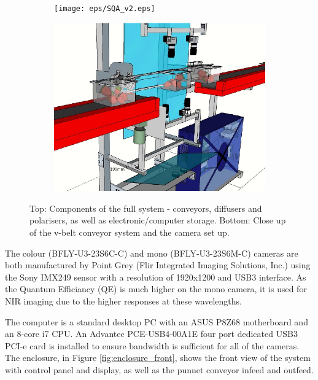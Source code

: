 \documentclass[conference]{IEEEtran}
\begin{document}
\begin{figure}[ht]
	\centering
	\begin{subfigure}{.5\textwidth}
		\centering
		\texttt{[image: eps/SQA\_v2.eps]}
		\caption{}
		\label{fig:enclosure_cross_sec}
	\end{subfigure}%
	
	\vspace{\floatsep}
	
	\begin{subfigure}{.5\textwidth}
		\centering
		\includegraphics[width=1\linewidth]{eps/QAS_cross_sec.eps}
		\caption{}
		\label{fig:close_up_cross_sec}
	\end{subfigure}%
	
	\caption{Top: Components of the full system - conveyors, diffusers and polarisers, as well as electronic/computer storage. Bottom: Close up of the v-belt conveyor system and the camera set up. }
	\label{fig:sample1}
\end{figure}

The colour (BFLY-U3-23S6C-C) and mono (BFLY-U3-23S6M-C) cameras are both manufactured by Point Grey (Flir Integrated Imaging Solutions, Inc.) using the Sony IMX249 sensor with a resolution of 1920x1200 and USB3 interface. As the Quantum Efficiancy (QE) is much higher on the mono camera, it is used for NIR imaging due to the higher responses at these wavelengths.

The computer is a standard desktop PC with an ASUS P8Z68 motherboard and an 8-core i7 CPU. An Advantec PCE-USB4-00A1E four port dedicated USB3 PCI-e card is installed to ensure bandwidth is sufficient for all of the cameras. The enclosure, in Figure \ref{fig:enclosure_front}, shows the front view of the system with control panel and display, as well as the punnet conveyor infeed and outfeed. 
\end{document}
